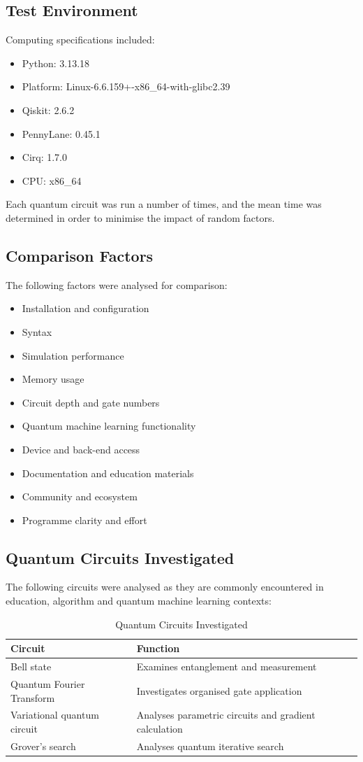 \documentclass[journal]{IEEEtran}
\begin{document}
\subsection{Test Environment}
Computing specifications included:
\begin{itemize}
\item Python: 3.13.18
\item Platform: Linux-6.6.159+-x86\_64-with-glibc2.39
\item Qiskit: 2.6.2
\item PennyLane: 0.45.1
\item Cirq: 1.7.0
\item CPU: x86\_64
\end{itemize}
Each quantum circuit was run a number of times, and the mean time was determined in order to minimise the impact of random factors.

\subsection{Comparison Factors}
The following factors were analysed for comparison:
\begin{itemize}
\item Installation and configuration
\item Syntax
\item Simulation performance
\item Memory usage
\item Circuit depth and gate numbers
\item Quantum machine learning functionality
\item Device and back-end access
\item Documentation and education materials
\item Community and ecosystem
\item Programme clarity and effort
\end{itemize}

\subsection{Quantum Circuits Investigated}
The following circuits were analysed as they are commonly encountered in education, algorithm and quantum machine learning contexts:

\begin{table}[!t]
\caption{Quantum Circuits Investigated}
\label{tab:circuits}
\centering
\small
\begin{tabularx}{\columnwidth}{l Y}
\toprule
\textbf{Circuit} & \textbf{Function}\\
\midrule
Bell state & Examines entanglement and measurement\\
Quantum Fourier Transform & Investigates organised gate application\\
Variational quantum circuit & Analyses parametric circuits and gradient calculation\\
Grover's search & Analyses quantum iterative search\\
\bottomrule
\end{tabularx}
\end{table}
\end{document}
